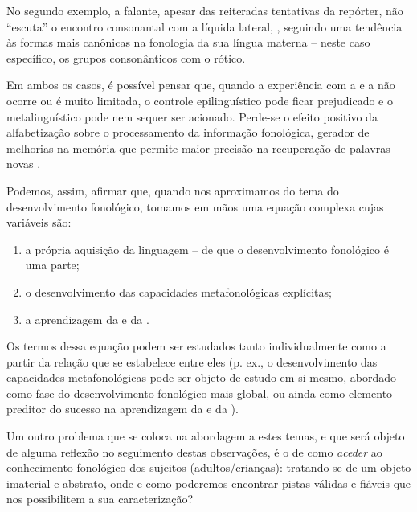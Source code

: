 \documentclass[output=paper]{LSP/langsci}
\begin{document}
No segundo exemplo, a falante, apesar das reiteradas tentativas da repórter, não “escuta” o encontro consonantal com a líquida lateral, , seguindo uma tendência às formas mais canônicas na fonologia da sua língua materna -- neste caso específico, os grupos consonânticos com o rótico.

Em ambos os casos, é possível pensar que, quando a experiência com a  e a  não ocorre ou é muito limitada, o controle epilinguístico pode ficar prejudicado e o metalinguístico pode nem sequer ser acionado. Perde-se o efeito positivo da alfabetização sobre o processamento da informação fonológica, gerador de melhorias na memória que permite maior precisão na recuperação de palavras novas \citep{goswamibryant1990}.

Podemos, assim, afirmar que, quando nos aproximamos do tema do desenvolvimento fonológico, tomamos em mãos uma equação complexa cujas variáveis são:

\begin{enumerate}[label=(\roman*)]
\item a própria aquisição da linguagem -- de que o desenvolvimento fonológico é uma parte;

\item o desenvolvimento das capacidades metafonológicas explícitas;
\item a aprendizagem da  e da .
\end{enumerate}

Os termos dessa equação podem ser estudados tanto individualmente como a partir da relação que se estabelece entre eles (p. ex., o desenvolvimento das capacidades metafonológicas pode ser objeto de estudo em si mesmo, abordado como fase do desenvolvimento fonológico mais global, ou ainda como elemento preditor do sucesso na aprendizagem da  e da ).

Um outro problema que se coloca na abordagem a estes temas, e que será objeto de alguma reflexão no seguimento destas observações, é o de como \textit{aceder} ao conhecimento fonológico dos sujeitos (adultos/crianças): tratando-se de um objeto imaterial e abstrato, onde e como poderemos encontrar pistas válidas e fiáveis que nos possibilitem a sua caracterização?
\end{document}
